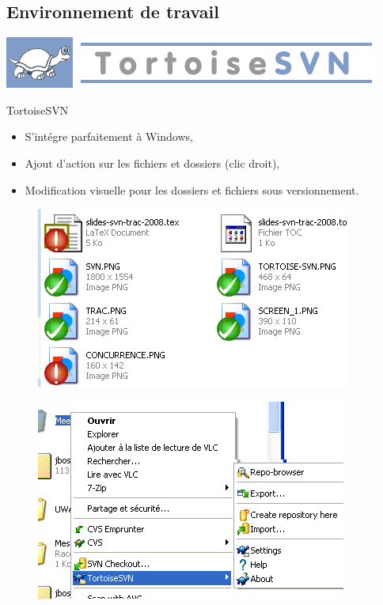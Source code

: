\subsection{Environnement de travail}
\begin{frame}
  \begin{center}
    \includegraphics[scale=0.35]{images/logo_tortoise}
  \end{center}
  \begin{alertblock}{TortoiseSVN}
    \begin{itemize}
    \item S'intégre parfaitement à Windows,
    \item Ajout d'action sur les fichiers et dossiers (clic droit),
      \item Modification visuelle pour les dossiers et fichiers sous versionnement.
      \end{itemize}
    \end{alertblock}
\end{frame}

\begin{frame}
  \begin{figure}
    \begin{center}
      \includegraphics[scale=0.7]{images/dirView}
    \end{center}
  \end{figure}
\end{frame}
\begin{frame}
  \begin{figure}
    \begin{center}
      \includegraphics[scale=0.7]{images/actions}
    \end{center}
  \end{figure}
\end{frame}

